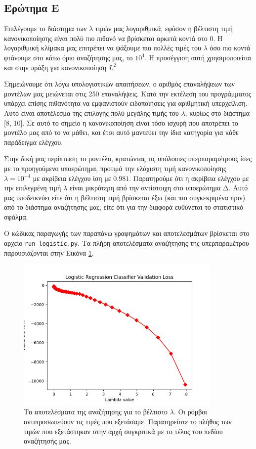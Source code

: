 \documentclass{article}
\newcommand{\code}{\texttt}
\begin{document}
\subsection{Ερώτημα Ε}
Επιλέγουμε το διάστημα των \code{$\lambda$} τιμών μας λογαριθμικά, εφόσον η βέλτιστη τιμή κανονικοποίησης είναι πολύ πιο πιθανό να βρίσκεται αρκετά κοντά στο 0. Η λογαριθμική κλίμακα μας επιτρέπει να ψάξουμε πιο πολλές τιμές του \code{$\lambda$} όσο πιο κοντά φτάνουμε στο κάτω όριο αναζήτησης μας, το $10^{4}$. Η προσέγγιση αυτή χρησιμοποιείται και στην πράξη για κανονικοποίηση $L^{2}$ \cite{jerome}\par

Σημειώνουμε ότι λόγω υπολογιστικών απαιτήσεων, ο αριθμός επαναλήψεων των μοντέλων μας μειώνεται στις 250 επαναλήψεις. Κατά την εκτέλεση του προγράμματος υπάρχει επίσης πιθανότητα να εμφανιστούν ειδοποιήσεις για αριθμητική υπερχείλιση. Αυτό είναι αποτέλεσμα της επιλογής πολύ μεγάλης τιμής του \code{$\lambda$}, κυρίως στο διάστημα [8, 10]. Σε αυτό το σημείο η κανονικοποίηση είναι τόσο ισχυρή που αποτρέπει το μοντέλο μας από το να μάθει, και έτσι αυτό μαντεύει την ίδια κατηγορία για κάθε παράδειγμα ελέγχου.\par

Στην δική μας περίπτωση το μοντέλο, κρατώντας τις υπόλοιπες υπερπαραμέτρους ίσες με το προηγούμενο υποερώτημα, προτιμά την ελάχιστη τιμή κανονικοποίησης \code{$\lambda = 10^{-4}$} με  ακρίβεια ελέγχου ίση με $0.981$. Παρατηρούμε ότι η ακρίβεια ελέγχου με την επιλεγμένη τιμή \code{$\lambda$} είναι μικρότερη από την αντίστοιχη στο υποερώτημα Δ. Αυτό μας υποδεικνύει είτε ότι η βέλτιστη τιμή βρίσκεται έξω (και πιο συγκεκριμένα πριν) από το διάστημα αναζήτησης μας, είτε ότι για την διαφορά ευθύνεται το στατιστικό σφάλμα. \par

Ο κώδικας παραγωγής των παραπάνω γραφημάτων και αποτελεσμάτων βρίσκεται στο αρχείο \code{run\_logistic.py}. Τα πλήρη αποτελέσματα αναζήτησης της υπερπαραμέτρου παρουσιάζονται στην Εικόνα \ref{logistic_lambda_accuracy}.

\begin{figure}
	\includegraphics[width=10cm]{logistic_lambda_accuracy.png}
	\centering
	\caption{ Τα αποτελέσματα της αναζήτησης για το βέλτιστο \code{$\lambda$}. Οι ρόμβοι αντιπροσωπεύουν τις τιμές που εξετάσαμε. Παρατηρείστε το πλήθος των τιμών που εξετάστηκαν στην αρχή συγκριτικά με το τέλος του πεδίου αναζήτησής μας.}
	\label{logistic_lambda_accuracy}
\end{figure}
\end{document}
